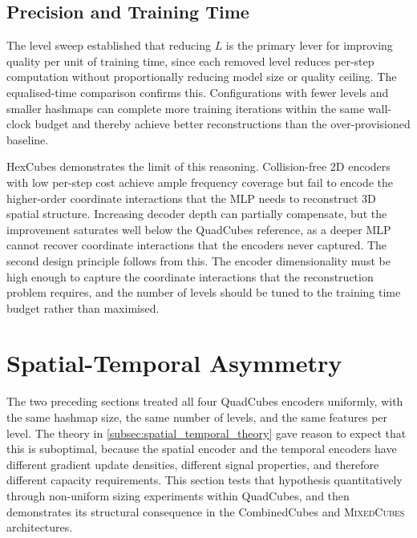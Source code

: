 \documentclass[12pt, a4paper, twoside]{report}
\newcommand{\MixedCubes}{\textsc{MixedCubes}}
\begin{document}
\subsection{Precision and Training Time}
\label{subsec:levels_synthesis}

The level sweep established that reducing $L$ is the primary lever for improving quality per unit of training time, since each removed level reduces per-step computation without proportionally reducing model size or quality ceiling. The equalised-time comparison confirms this. Configurations with fewer levels and smaller hashmaps can complete more training iterations within the same wall-clock budget and thereby achieve better reconstructions than the over-provisioned baseline.

HexCubes demonstrates the limit of this reasoning. Collision-free 2D encoders with low per-step cost achieve ample frequency coverage but fail to encode the higher-order coordinate interactions that the MLP needs to reconstruct 3D spatial structure. Increasing decoder depth can partially compensate, but the improvement saturates well below the QuadCubes reference, as a deeper MLP cannot recover coordinate interactions that the encoders never captured. The second design principle follows from this. The encoder dimensionality must be high enough to capture the coordinate interactions that the reconstruction problem requires, and the number of levels should be tuned to the training time budget rather than maximised.

\section{Spatial-Temporal Asymmetry}
\label{sec:spatial_temporal_asym}

The two preceding sections treated all four QuadCubes encoders uniformly, with the same hashmap size, the same number of levels, and the same features per level. The theory in \cref{subsec:spatial_temporal_theory} gave reason to expect that this is suboptimal, because the spatial encoder and the temporal encoders have different gradient update densities, different signal properties, and therefore different capacity requirements. This section tests that hypothesis quantitatively through non-uniform sizing experiments within QuadCubes, and then demonstrates its structural consequence in the CombinedCubes and \MixedCubes{} architectures.
\end{document}

